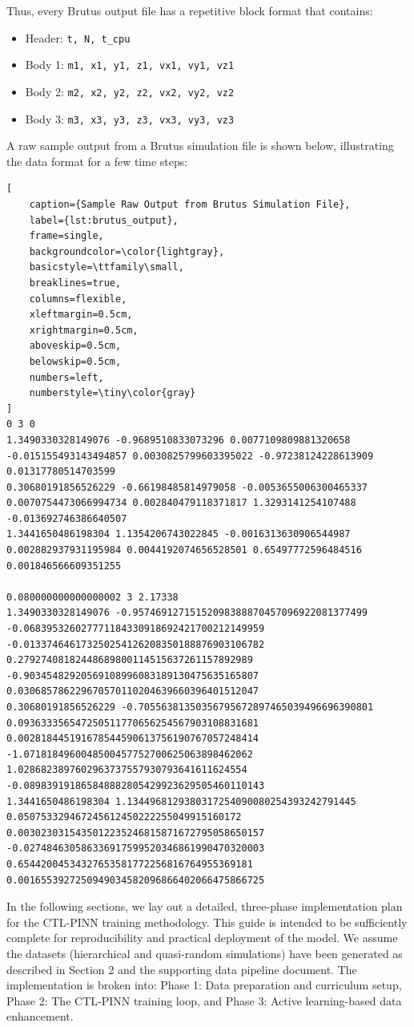 Thus, every Brutus output file has a repetitive block format that contains:
\begin{itemize}
    \item Header: \texttt{t, N, t\_cpu}
    \item Body 1: \texttt{m1, x1, y1, z1, vx1, vy1, vz1}
    \item Body 2: \texttt{m2, x2, y2, z2, vx2, vy2, vz2}
    \item Body 3: \texttt{m3, x3, y3, z3, vx3, vy3, vz3}
\end{itemize}

A raw sample output from a Brutus simulation file is shown below, illustrating the data format for a few time steps:

\begin{lstlisting}[
    caption={Sample Raw Output from Brutus Simulation File},
    label={lst:brutus_output},
    frame=single,
    backgroundcolor=\color{lightgray},
    basicstyle=\ttfamily\small,
    breaklines=true,
    columns=flexible,
    xleftmargin=0.5cm,
    xrightmargin=0.5cm,
    aboveskip=0.5cm,
    belowskip=0.5cm,
    numbers=left,
    numberstyle=\tiny\color{gray}
]
0 3 0
1.3490330328149076 -0.9689510833073296 0.0077109809881320658 -0.015155493143494857 0.0030825799603395022 -0.97238124228613909 0.01317780514703599
0.30680191856526229 -0.66198485814979058 -0.0053655006300465337 0.0070754473066994734 0.002840479118371817 1.3293141254107488 -0.013692746386640507
1.3441650486198304 1.1354206743022845 -0.0016313630906544987 0.002882937931195984 0.0044192074656528501 0.65497772596484516 0.001846566609351255

0.080000000000000002 3 2.17338
1.3490330328149076 -0.95746912715152098388870457096922081377499 -0.068395326027771184330918692421700212149959 -0.013374646173250254126208350188876903106782 0.27927408182448689800114515637261157892989 -0.90345482920569108996083189130475635165807 0.030685786229670570110204639660396401512047
0.30680191856526229 -0.70556381350356795672897465039496696390801 0.093633356547250511770656254567903108831681 0.002818445191678544590613756190767057248414 -1.0718184960048500457752700625063898462062 1.0286823897602963737557930793641611624554 -0.089839191865848882805429923629505460110143
1.3441650486198304 1.1344968129380317254090080254393242791445 0.050753329467245612450222255049915160172 0.0030230315435012235246815871672795058650157 -0.027484630586336917599520346861990470320003 0.65442004534327653581772256816764955369181 0.0016553927250949034582096866402066475866725
\end{lstlisting}





In the following sections, we lay out a detailed, three-phase implementation plan for the CTL-PINN training methodology.  
This guide is intended to be sufficiently complete for reproducibility and practical deployment of the model.  
We assume the datasets (hierarchical and quasi-random simulations) have been generated as described in Section 2 and the supporting data pipeline document.  
The implementation is broken into: Phase 1: Data preparation and curriculum setup, Phase 2: The CTL-PINN training loop, and Phase 3: Active learning-based data enhancement. 
